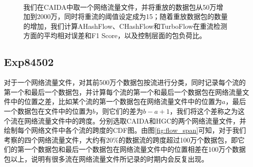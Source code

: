 \documentclass{article}
\begin{document}
\begin{figure}[ht!]
	\centering
	\mbox{
	}
	\mbox{
	}
	\caption{我们在CAIDA中取一个网络流量文件，并将重放的数据包从50万增加到2000万，同时将重流的阈值设定成为15；随着重放数据包的数量的增加，我们计算AHashFlow、CHashFlow和TurboFlow在重流检测方面的平均相对误差和F1 Score，以及控制层面的包负荷比。}
	\label{fig:hh_dection_various_pkt_number}
\end{figure}


\subsection{Exp84502}
对于一个网络流量文件，对其前500万个数据包按流进行分类，同时记录每个流的第一个和最后一个数据包，并计算每个流的第一个和最后一个数据包在网络流量文件中的位置之差，比如某个流的第一个数据包在网络流量文件中的位置为$a$，最后一个数据包在文件中的位置为$b$，则它们的差为$b-a+1$，我们将这个差称之为这个流在网络流量文件中的跨度。分别选取CAIDA和HGC的两个网络流量文件，并绘制每个网络文件中各个流的跨度的CDF图。由图\ref{fig:flow_span}可知，对于我们考察的四个网络流量文件，大约有20\%的数据流的跨度超过100万个数据包，即它们的第一个数据包和最后一个数据包在网络流量文件中的位置相差在100万个数据包以上，说明有很多流在网络流量文件所记录的时期内会反复出现。
\end{document}
